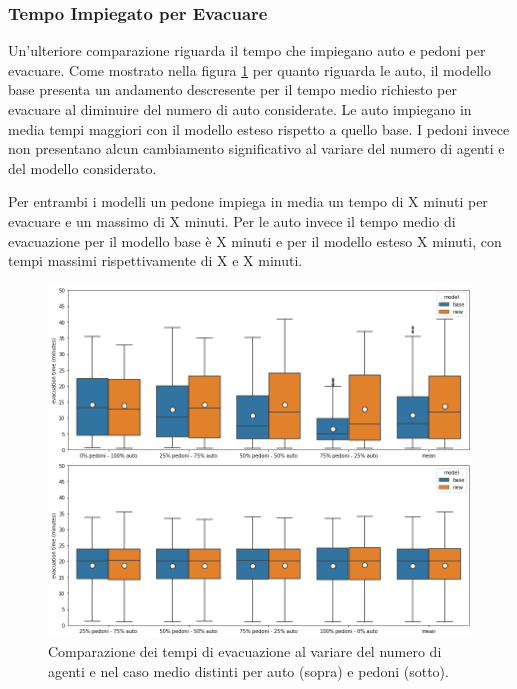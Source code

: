 \pagebreak

\subsubsection*{Tempo Impiegato per Evacuare}
Un'ulteriore comparazione riguarda il tempo che impiegano auto e pedoni per evacuare.
Come mostrato nella figura \ref{fig:analisi-comparison-evtimes2} per quanto riguarda le auto, il modello base presenta un andamento descresente per il tempo medio richiesto per evacuare al diminuire del numero di auto considerate.
Le auto impiegano in media tempi maggiori con il modello esteso rispetto a quello base.
%
I pedoni invece non presentano alcun cambiamento significativo al variare del numero di agenti e del modello considerato.

Per entrambi i modelli un pedone impiega in media un tempo di X minuti per evacuare e un massimo di X minuti.
Per le auto invece il tempo medio di evacuazione per il modello base è X minuti e per il modello esteso X minuti,
con tempi massimi rispettivamente di X e X minuti.

\begin{figure}[ht]
    \centering
    \includegraphics[width=\textwidth]{images/analisi/comparison-evtimes2.png}
    \caption{
        Comparazione dei tempi di evacuazione al variare del numero di agenti e nel caso medio distinti per auto (sopra) e pedoni (sotto).
    }
    \label{fig:analisi-comparison-evtimes2}
\end{figure}


